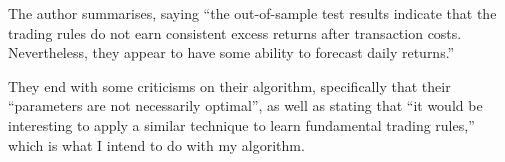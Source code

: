 The author summarises, saying ``the out-of-sample test results indicate that the trading rules do not earn consistent excess returns after transaction costs. Nevertheless, they appear to have some ability to forecast daily returns.'' \newline

They end with some criticisms on their algorithm, specifically that their ``parameters are not necessarily optimal'', as well as stating that ``it would be interesting to apply a similar technique to learn fundamental trading rules,'' which is what I intend to do with my algorithm.